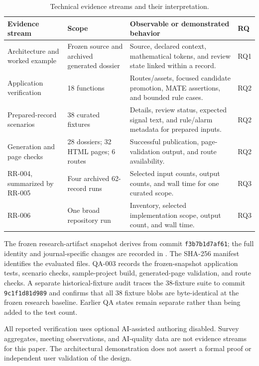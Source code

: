 \documentclass[a4paper,fleqn]{cas-dc}
\begin{document}
\begin{table}[!t]
\centering
\caption{Technical evidence streams and their interpretation.}
\label{tab:studies}
\begin{tabularx}{\textwidth}{p{}p{}Xp{}}
\toprule
\textbf{Evidence stream} & \textbf{Scope} & \textbf{Observable or demonstrated behavior} & \textbf{RQ} \\
\midrule
Architecture and worked example & Frozen source and archived generated dossier & Source, declared context, mathematical tokens, and review state linked within a record. & RQ1 \\
Application verification & 18 functions & Routes/assets, focused candidate promotion, MATE assertions, and bounded rule cases. & RQ2 \\
Prepared-record scenarios & 38 curated fixtures & Details, review status, expected signal text, and rule/alarm metadata for prepared inputs. & RQ2 \\
Generation and page checks & 28 dossiers; 32 HTML pages; 6 routes & Successful publication, page-validation output, and route availability. & RQ2 \\
RR-004, summarized by RR-005 & Four archived 62-record runs & Selected input counts, output counts, and wall time for one curated scope. & RQ3 \\
RR-006 & One broad repository run & Inventory, selected implementation scope, output count, and wall time. & RQ3 \\
\bottomrule
\end{tabularx}
\end{table}

The frozen research-artifact snapshot derives from commit \texttt{f3b7b1d7af61}; the full identity and journal-specific changes are recorded in . The SHA-256 manifest identifies the evaluated files. QA-003 records the frozen-snapshot application tests, scenario checks, sample-project build, generated-page validation, and route checks. A separate historical-fixture audit traces the 38-fixture suite to commit \texttt{9c1f1d81d989} and confirms that all 38 fixture blobs are byte-identical at the frozen research baseline. Earlier QA states remain separate rather than being added to the test count.

All reported verification uses optional AI-assisted authoring disabled. Survey aggregates, meeting observations, and AI-quality data are not evidence streams for this paper. The architectural demonstration does not assert a formal proof or independent user validation of the design.
\end{document}
